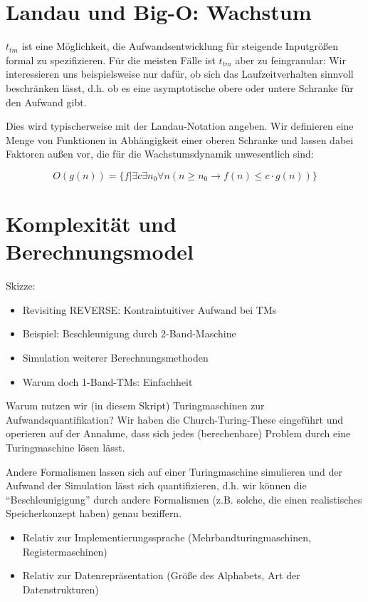 \section{Landau und Big-O: Wachstum}

$t_{tm}$ ist eine Möglichkeit,
die Aufwandsentwicklung für steigende Inputgrößen formal zu spezifizieren.
Für die meisten Fälle ist $t_{tm}$ aber zu feingranular:
Wir interessieren uns beispielsweise nur dafür,
ob sich das Laufzeitverhalten sinnvoll beschränken lässt,
d.h. ob es eine asymptotische obere oder untere Schranke für den Aufwand gibt.

Dies wird typischerweise mit der Landau-Notation angeben.
Wir definieren eine Menge von Funktionen in Abhängigkeit einer oberen Schranke
und lassen dabei Faktoren außen vor,
die für die Wachstumsdynamik unwesentlich sind:

\[
O(g(n)) = \{f|\exists c \exists n_0 \forall n (n \geq n_0 \rightarrow f(n) \leq c \cdot g(n))\}
\]


\section{Komplexität und Berechnungsmodel}

Skizze:
\begin{itemize}
        \item Revisiting REVERSE: Kontraintuitiver Aufwand bei TMs 
        \item Beispiel: Beschleunigung durch 2-Band-Maschine 
        \item Simulation weiterer Berechnungsmethoden 
        \item Warum doch 1-Band-TMs: Einfachheit
\end{itemize}

Warum nutzen wir (in diesem Skript) Turingmaschinen zur Aufwandsquantifikation?
Wir haben die Church-Turing-These eingeführt und operieren auf der Annahme,
dass sich jedes (berechenbare) Problem durch eine Turingmaschine lösen lässt.

Andere Formalismen lassen sich auf einer Turingmaschine simulieren und
der Aufwand der Simulation lässt sich quantifizieren,
d.h. wir können die ``Beschleunigigung'' durch andere Formalismen
(z.B. solche, die einen realistisches Speicherkonzept haben)
genau beziffern.

\begin{itemize}
    \item Relativ zur Implementierungssprache (Mehrbandturingmaschinen, Registermaschinen)
    \item Relativ zur Datenrepräsentation (Größe des Alphabets, Art der Datenstrukturen)
\end{itemize}

